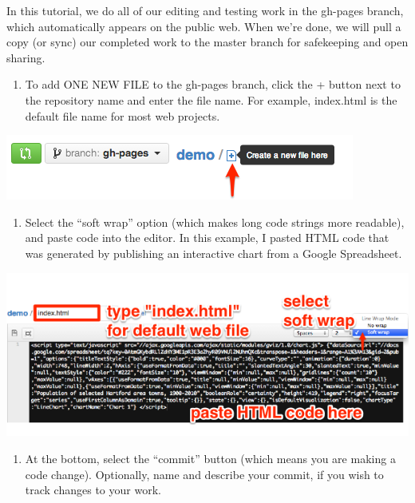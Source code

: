\documentclass[
  english,
]{book}
\providecommand{\tightlist}{%
  \setlength{\itemsep}{0pt}\setlength{\parskip}{0pt}}
\begin{document}
In this tutorial, we do all of our editing and testing work in the gh-pages branch, which automatically appears on the public web. When we're done, we will pull a copy (or sync) our completed work to the master branch for safekeeping and open sharing.

\begin{enumerate}
\def\labelenumi{\arabic{enumi})}
\setcounter{enumi}{3}
\tightlist
\item
  To add ONE NEW FILE to the gh-pages branch, click the + button next to the repository name and enter the file name. For example, index.html is the default file name for most web projects.
\end{enumerate}

\includegraphics{images/08-github/GitHub-CreateNewFile.png}

\begin{enumerate}
\def\labelenumi{\arabic{enumi})}
\setcounter{enumi}{4}
\tightlist
\item
  Select the ``soft wrap'' option (which makes long code strings more readable), and paste code into the editor. In this example, I pasted HTML code that was generated by publishing an interactive chart from a Google Spreadsheet.
\end{enumerate}

\includegraphics{images/08-github/GitHub-CreateFile.png}

\begin{enumerate}
\def\labelenumi{\arabic{enumi})}
\setcounter{enumi}{5}
\tightlist
\item
  At the bottom, select the ``commit'' button (which means you are making a code change). Optionally, name and describe your commit, if you wish to track changes to your work.
\end{enumerate}
\end{document}
